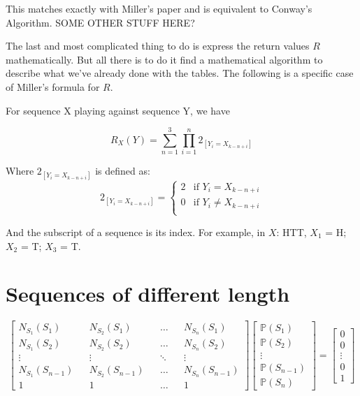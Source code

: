 \documentclass[english,12pt,a4paper,final]{article}
\begin{document}
This matches exactly with Miller's paper and is equivalent to Conway's Algorithm. SOME OTHER STUFF HERE?

The last and most complicated thing to do is express the return values $R$ mathematically. But all there is to do it find a mathematical algorithm to describe what we've already done with the tables. The following is a specific case of Miller's formula for $R$.

For sequence X playing against sequence Y, we have

\begin{equation*}
	R_X(Y) = \sum_{n=1}^{3} \prod_{i=1}^{n} 2_{[Y_i = X_{k-n+i}]}
\end{equation*}

Where $2_{[Y_i = X_{k-n+i}]}$ is defined as:
\begin{equation*}
	2_{[Y_i = X_{k-n+i}]} = \begin{cases}
		2 & \text{if } Y_i = X_{k-n+i} \\
		0 & \text{if } Y_i \neq X_{k-n+i} \\
	\end{cases}
\end{equation*}

And the subscript of a sequence is its index. For example, in $X$: HTT, $X_1$ = H; $X_2$ = T; $X_3$ = T.

\section{Sequences of different length}

\begin{equation}\label{generalFormula}
	\begin{bmatrix}
		N_{S_1}(S_1) && N_{S_2}(S_1) && \dots && N_{S_n}(S_1) \\
		N_{S_1}(S_2) && N_{S_2}(S_2) && \dots && N_{S_n}(S_2) \\
		\vdots && \vdots && \ddots && \vdots \\
		N_{S_1}(S_{n-1}) && N_{S_2}(S_{n-1}) && \dots && N_{S_n}(S_{n-1}) \\
		1 && 1 && \dots && 1
	\end{bmatrix}
	\begin{bmatrix}
		\mathbb{P}(S_1) \\ \mathbb{P}(S_2) \\ \vdots \\ \mathbb{P}(S_{n-1}) \\  \mathbb{P}(S_n)
	\end{bmatrix}
	=
	\begin{bmatrix}
		0 \\ 0 \\ \vdots \\ 0 \\ 1
	\end{bmatrix}
\end{equation}
\end{document}
